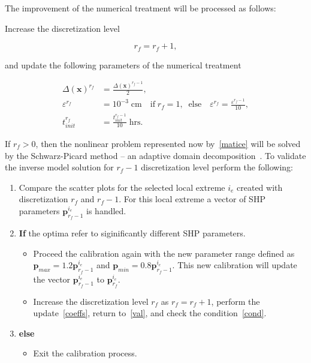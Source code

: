 \documentclass[review,times,3p,twocolumn,10pt]{elsarticle}
\newenvironment{lineq}
    {\begin{linenomath*}
    \begin{equation}
    }
    { 
    \end{equation} 
    \end{linenomath*}
    }
\renewcommand{\vec}{\mathbf}
\newcommand{\subscript}[2]{$#1 _ #2$}
\begin{document}
\begin{enumerate}[label=({\bf \roman*})]
 The improvement of the numerical treatment will be processed as follows:

Increase the discretization level \begin{lineq} r_f=r_f+1,\end{lineq} and update the following parameters of the numerical treatment
\begin{lineq}
\label{coeffs}
\begin{split}
\Delta(\vec{x})^{r_f}  &= \frac{\Delta(\vec{x})^{r_f-1}}{2}, \\
\varepsilon^{r_f} &= 10^{-3} \; \mbox{cm} \quad  \mbox{if} \; r_f = 1, \; \; \mbox{else} \quad \varepsilon^{r_f} = \frac{\varepsilon^{r_f-1}}{10}, \\
t_{init}^{r_f} &=  \frac{t_{init}^{r_f-1}}{10} \; \mbox{hrs} .
\end{split}
\end{lineq}
If $r_f > 0$, then the nonlinear problem represented now by~\eqref{matice} will be solved by the Schwarz-Picard method -- an adaptive domain decomposition~\citep{mojeamc2}. To validate the inverse model solution for $r_f-1$ discretization level perform the following:
  \begin{enumerate}
    \item \label{val} Compare the scatter 
   plots for the selected local extreme $i_e$ created with discretization $r_f$ and $r_f-1$. For this local extreme a vector of SHP parameters $\vec{p}_{r_f-1}^{i_e}$ is handled.  
    \item \label{cond} {\bf If} the optima refer to siginificantly different SHP parameters.  
   \begin{itemize}%
    \item Proceed the calibration  again with the new parameter range defined as $\vec{p}_{max} = 1.2\vec{p}_{r_f-1}^{i_e}$ and  $\vec{p}_{min} = 0.8\vec{p}_{r_f-1}^{i_e}$. This new calibration will update the vector  $\vec{p}_{r_f-1}^{i_e}$ to $\vec{p}_{r_f}^{i_e}$.
    \item \label{ll2} Increase the discretization level $r_f$ as $r_f=r_f+1$, perform the update~\eqref{coeffs}, return to~\ref{val}, and check the condition~\ref{cond}.
    \end{itemize}
    \item {\bf else}
    \begin{itemize}%
    \item Exit the calibration process.
    \end{itemize}
  \end{enumerate}
\end{enumerate}
\end{document}
